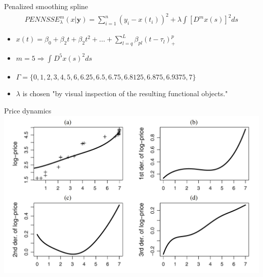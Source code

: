 \documentclass[hyperref={pdfpagelabels=false}]{beamer}
\begin{document}
    
    
    \begin{frame}{Penalized smoothing spline}
    \begin{align*}
    PENNSSE^{m}_{\lambda}(x|\mathbf{y})=\sum_{i=1}^n (y_i^{}-x^{}(t_i))^2+\lambda \int[D^mx(s)]^2ds
    \end{align*}
    \begin{itemize}
    \item $x(t)=\beta_0+\beta_2t+\beta_2t^2+...+\sum_{l=q}^L \beta_{pl}(t-\tau_l)^p_+$
    \item $m = 5 \Rightarrow \int_{}^{}D^5x(s)^2 ds$ %
    \item $\Gamma=\{0, 1, 2, 3, 4, 5, 6, 6.25, 6.5, 6.75, 6.8125, 6.875, 6.9375, 7\}$
    \item $\lambda$ is chosen "by visual inspection of the resulting functional
    objects."
    \end{itemize}
    
    \end{frame}
    
    
    \begin{frame}{Price dynamics}
    \center
    \includegraphics[width=1\textwidth]{smooth_velocity}
    \end{frame}
    
\end{document}
